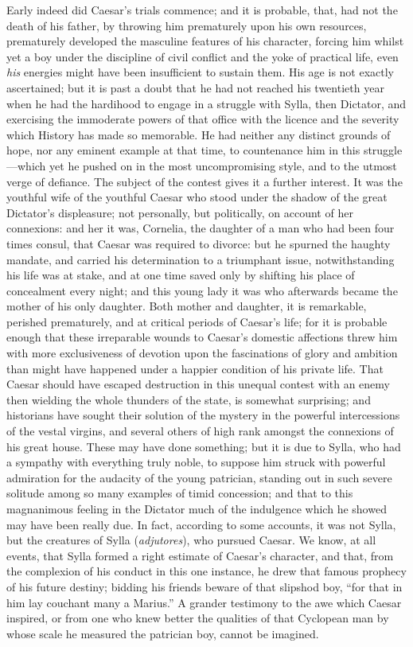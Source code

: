 Early indeed did Caesar's trials commence; and it is probable, that, had
not the death of his father, by throwing him prematurely upon his own
resources, prematurely developed the masculine features of his
character, forcing him whilst yet a boy under the discipline of civil
conflict and the yoke of practical life, even \emph{his} energies might have
been insufficient to sustain them. His age is not exactly ascertained;
but it is past a doubt that he had not reached his twentieth year when
he had the hardihood to engage in a struggle with Sylla, then Dictator,
and exercising the immoderate powers of that office with the licence and
the severity which History has made so memorable. He had neither any
distinct grounds of hope, nor any eminent example at that time, to
countenance him in this struggle—which yet he pushed on in the most
uncompromising style, and to the utmost verge of defiance. The subject
of the contest gives it a further interest. It was the youthful wife of
the youthful Caesar who stood under the shadow of the great Dictator's
displeasure; not personally, but politically, on account of her
connexions: and her it was, Cornelia, the daughter of a man who had been
four times consul, that Caesar was required to divorce: but he spurned
the haughty mandate, and carried his determination to a triumphant
issue, notwithstanding his life was at stake, and at one time saved only
by shifting his place of concealment every night; and this young lady it
was who afterwards became the mother of his only daughter. Both mother
and daughter, it is remarkable, perished prematurely, and at critical
periods of Caesar's life; for it is probable enough that these
irreparable wounds to Caesar's domestic affections threw him with more
exclusiveness of devotion upon the fascinations of glory and ambition
than might have happened under a happier condition of his private life.
That Caesar should have escaped destruction in this unequal contest with
an enemy then wielding the whole thunders of the state, is somewhat
surprising; and historians have sought their solution of the mystery in
the powerful intercessions of the vestal virgins, and several others of
high rank amongst the connexions of his great house. These may have done
something; but it is due to Sylla, who had a sympathy with everything
truly noble, to suppose him struck with powerful admiration for the
audacity of the young patrician, standing out in such severe solitude
among so many examples of timid concession; and that to this magnanimous
feeling in the Dictator much of the indulgence which he showed may have
been really due. In fact, according to some accounts, it was not Sylla,
but the creatures of Sylla (\emph{adjutores}), who pursued Caesar. We know,
at all events, that Sylla formed a right estimate of Caesar's character,
and that, from the complexion of his conduct in this one instance, he
drew that famous prophecy of his future destiny; bidding his friends
beware of that slipshod boy, ``for that in him lay couchant many a
Marius.'' A grander testimony to the awe which Caesar inspired, or from
one who knew better the qualities of that Cyclopean man by whose scale
he measured the patrician boy, cannot be imagined.

